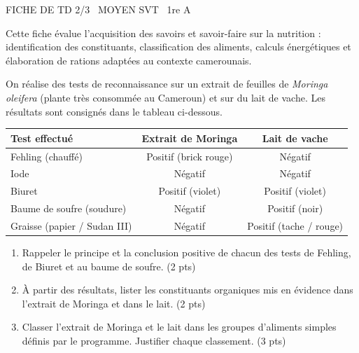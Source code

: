 \documentclass[11pt]{article}
\begin{document}
\begin{tcolorbox}[enhanced,colback=popink,colframe=popink,arc=10pt,boxrule=0pt,left=12pt,right=12pt,top=9pt,bottom=9pt]
{\color{white}\popxbold\small FICHE DE TD 2/3 \textbullet\ MOYEN \hfill SVT \textbullet\ 1re A\par}
\end{tcolorbox}
\vspace{4pt}
Cette fiche évalue l'acquisition des savoirs et savoir-faire sur la nutrition : identification des constituants, classification des aliments, calculs énergétiques et élaboration de rations adaptées au contexte camerounais.

\begin{exercice}
On réalise des tests de reconnaissance sur un extrait de feuilles de \textit{Moringa oleifera} (plante très consommée au Cameroun) et sur du lait de vache. Les résultats sont consignés dans le tableau ci-dessous.

\begin{tabular}{|l|c|c|}
\hline
\textbf{Test effectué} & \textbf{Extrait de Moringa} & \textbf{Lait de vache} \\
\hline
Fehling (chauffé) & Positif (brick rouge) & Négatif \\
\hline
Iode & Négatif & Négatif \\
\hline
Biuret & Positif (violet) & Positif (violet) \\
\hline
Baume de soufre (soudure) & Négatif & Positif (noir) \\
\hline
Graisse (papier / Sudan III) & Négatif & Positif (tache / rouge) \\
\hline
\end{tabular}

\begin{enumerate}
\item Rappeler le principe et la conclusion positive de chacun des tests de Fehling, de Biuret et au baume de soufre. \hfill (2 pts)
\item À partir des résultats, lister les constituants organiques mis en évidence dans l'extrait de Moringa et dans le lait. \hfill (2 pts)
\item Classer l'extrait de Moringa et le lait dans les groupes d'aliments simples définis par le programme. Justifier chaque classement. \hfill (3 pts)
\end{enumerate}
\end{exercice}
\end{document}
